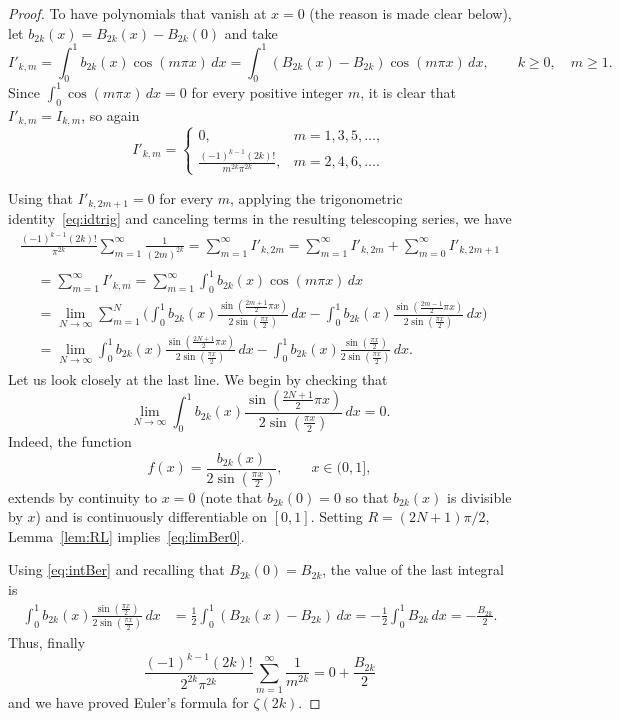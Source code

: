 \documentclass[11pt, oneside]{article}
\theoremstyle{plain}
\theoremstyle{definition}
\begin{document}
\begin{proof}
To have polynomials that vanish at $x=0$ (the reason is made clear below), 
let $b_{2k}(x) = B_{2k}(x)-B_{2k}(0)$ and take
\[
  I'_{k,m} = \int_0^{1} b_{2k}(x) \cos(m\pi x)\,dx
  = \int_0^{1} (B_{2k}(x)-B_{2k}) \cos(m\pi x)\,dx,
  \qquad k \ge 0, \quad m \ge 1.
\]
Since $\int_0^1 \cos(m\pi x)\,dx = 0$ for every positive integer $m$, it is clear that $I'_{k,m} = I_{k,m}$, so again
\[
  I'_{k,m} = 
  \begin{cases}
  0, & m=1,3,5,\dots, \\
  \displaystyle \frac{(-1)^{k-1}(2k)!}{m^{2k} \pi^{2k}}, & m=2,4,6,\dots.
  \end{cases}
\]

Using that $I'_{k,2m+1} = 0$ for every $m$, applying the trigonometric identity~\eqref{eq:idtrig} and canceling terms in the resulting telescoping series, we have
\begin{multline*}
  \frac{(-1)^{k-1}(2k)!}{\pi^{2k}} \sum_{m=1}^{\infty} \frac{1}{(2m)^{2k}} 
  = \sum_{m=1}^{\infty} I'_{k,2m}
  = \sum_{m=1}^{\infty} I'_{k,2m} + \sum_{m=0}^{\infty} I'_{k,2m+1} \\
\begin{aligned}
  &= \sum_{m=1}^{\infty} I'_{k,m}
  = \sum_{m=1}^{\infty} \int_0^{1} b_{2k}(x) \cos(m\pi x)\,dx \\
  &= \lim_{N \to \infty} \sum_{m=1}^{N} \Bigg( 
    \int_0^{1} b_{2k}(x) \frac{\sin(\frac{2m+1}{2}\pi x)}{2\sin(\frac{\pi x}{2})}\,dx
    - \int_0^{1} b_{2k}(x) \frac{\sin(\frac{2m-1}{2}\pi x)}{2\sin(\frac{\pi x}{2})}\,dx \Bigg) \\
  &= \lim_{N \to \infty} \int_0^{1} b_{2k}(x) \frac{\sin(\frac{2N+1}{2}\pi x)}{2\sin(\frac{\pi x}{2})}\,dx
  - \int_0^{1} b_{2k}(x) \frac{\sin(\frac{\pi x}{2})}{2\sin(\frac{\pi x}{2})}\,dx.
\end{aligned}
\end{multline*}
Let us look closely at the last line. We begin by checking that
\begin{equation}
\label{eq:limBer0}
  \lim_{N \to \infty} \int_0^{1} b_{2k}(x) 
  \frac{\sin(\frac{2N+1}{2}\pi x)}{2\sin(\frac{\pi x}{2})}\,dx = 0.
\end{equation}
Indeed, the function
\[
  f(x) = \frac{b_{2k}(x)}{2\sin(\frac{\pi x}{2})}, \qquad x \in (0,1],
\] 
extends by continuity to $x=0$ (note that $b_{2k}(0)=0$ so that $b_{2k}(x)$ is divisible by $x$) and is continuously differentiable on $[0,1]$.
Setting $R = (2N + 1)\pi/2$, Lemma~\ref{lem:RL} implies~\eqref{eq:limBer0}.

Using \eqref{eq:intBer} and recalling that $B_{2k}(0)=B_{2k}$, the value of the last integral is
\begin{align*}
  \int_0^{1} b_{2k}(x) \frac{\sin(\frac{\pi x}{2})}{2\sin(\frac{\pi x}{2})}\,dx
  &= \frac{1}{2} \int_0^{1} (B_{2k}(x)-B_{2k}) \,dx 
  = -\frac{1}{2} \int_0^{1} B_{2k} \, dx 
  = -\frac{B_{2k}}{2}.
\end{align*}
Thus, finally
\[
  \frac{(-1)^{k-1}(2k)!}{2^{2k}\pi^{2k}} \sum_{m=1}^{\infty} \frac{1}{m^{2k}} = 0 + \frac{B_{2k}}{2}
\]
and we have proved Euler's formula for $\zeta(2k)$.
\end{proof}
\end{document}
